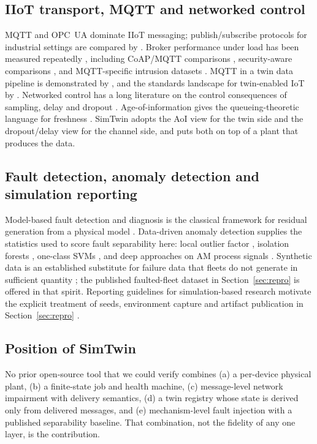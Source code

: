 \documentclass[preprint,12pt,authoryear,nopreprintline]{elsarticle}
\newcommand{\smt}{SimTwin}
\begin{document}
\subsection{IIoT transport, MQTT and networked control}
MQTT \citep{mqtt311oasis,mqtt5oasis} and OPC~UA \citep{cho2010opcua} dominate
IIoT messaging; publish/subscribe protocols for industrial settings are compared
by \citet{shafique2022pubsub}.
Broker performance under load has been measured repeatedly
\citep{tonelli2020mqtt,tonelli2021brokers,martins2021mqttperf}, including
CoAP/MQTT comparisons \citep{florez2021coapmqtt}, security-aware comparisons
\citep{lei2024mqttsec}, and MQTT-specific intrusion datasets
\citep{cunha2023dosmqtt}.
MQTT in a twin data pipeline is demonstrated by \citet{slemda2021sladta}, and the
standards landscape for twin-enabled IoT by \citet{kaltenerstaleh2020dtiot}.
Networked control has a long literature on the control consequences of sampling,
delay and dropout \citep{zhang2001ncs,walsh2002ncs}.
Age-of-information gives the queueing-theoretic language for freshness
\citep{kaul2012aoi,yates2021aoi}.
\smt{} adopts the AoI view for the twin side and the dropout/delay view for the
channel side, and puts both on top of a plant that produces the data.

\subsection{Fault detection, anomaly detection and simulation reporting}
Model-based fault detection and diagnosis is the classical framework for
residual generation from a physical model \citep{isermann2005fault}.
Data-driven anomaly detection supplies the statistics used to score fault
separability here: local outlier factor \citep{breunig2000lof,blazquez2021lof},
isolation forests \citep{liu2008iforest}, one-class SVMs
\citep{scholkopf2001ocsvm}, and deep approaches on AM process signals
\citep{darban2024deep}.
Synthetic data is an established substitute for failure data that fleets do not
generate in sufficient quantity \citep{synthpdm2026}; the published faulted-fleet
dataset in Section~\ref{sec:repro} is offered in that spirit.
Reporting guidelines for simulation-based research motivate the explicit
treatment of seeds, environment capture and artifact publication in
Section~\ref{sec:repro} \citep{rahmandad2012repro}.

\subsection{Position of \smt{}}
No prior open-source tool that we could verify combines (a) a per-device
physical plant, (b) a finite-state job and health machine, (c) message-level
network impairment with delivery semantics, (d) a twin registry whose state is
derived only from delivered messages, and (e) mechanism-level fault injection
with a published separability baseline.
That combination, not the fidelity of any one layer, is the contribution.
\end{document}
